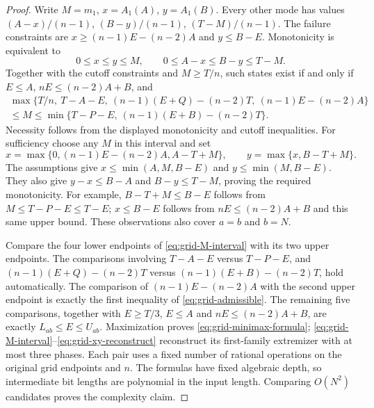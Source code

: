 \begin{proof}
Write $M=m_1$, $x=A_1(A)$, $y=A_1(B)$. Every other mode has values
$(A-x)/(n-1)$, $(B-y)/(n-1)$, $(T-M)/(n-1)$. The failure constraints
are $x\ge(n-1)E-(n-2)A$ and $y\le B-E$. Monotonicity is equivalent to
\[
 0\le x\le y\le M,\qquad 0\le A-x\le B-y\le T-M.
\]
Together with the cutoff constraints and $M\ge T/n$, such states exist
if and only if $E\le A$, $nE\le(n-2)A+B$, and
\begin{equation}\label{eq:grid-M-interval}
\begin{split}
 \max\{T/n,\ T-A-E,\ (n-1)(E+Q)-(n-2)T,\ (n-1)E-(n-2)A\}
 \\
 \le M\le\min\{T-P-E,\ (n-1)(E+B)-(n-2)T\}.
\end{split}
\end{equation}
Necessity follows from the displayed monotonicity and cutoff inequalities.
For sufficiency choose any $M$ in this interval and set
\begin{equation}\label{eq:grid-xy-reconstruct}
 x=\max\{0,(n-1)E-(n-2)A,A-T+M\},\qquad
 y=\max\{x,B-T+M\}.
\end{equation}
The assumptions give $x\le\min(A,M,B-E)$ and
$y\le\min(M,B-E)$. They also give $y-x\le B-A$ and
$B-y\le T-M$, proving the required monotonicity. For example,
$B-T+M\le B-E$ follows from $M\le T-P-E\le T-E$;
$x\le B-E$ follows from $nE\le(n-2)A+B$ and this same upper bound.
These observations also cover $a=b$ and $b=N$.

Compare the four lower endpoints of \eqref{eq:grid-M-interval} with its
two upper endpoints. The comparisons involving $T-A-E$ versus
$T-P-E$, and $(n-1)(E+Q)-(n-2)T$ versus
$(n-1)(E+B)-(n-2)T$, hold automatically.
The comparison of $(n-1)E-(n-2)A$ with the second upper endpoint is
exactly the first inequality of \eqref{eq:grid-admissible}.
The remaining five comparisons, together with $E\ge T/3$, $E\le A$
and $nE\le(n-2)A+B$, are exactly $L_{ab}\le E\le U_{ab}$.
Maximization proves \eqref{eq:grid-minimax-formula};
\eqref{eq:grid-M-interval}--\eqref{eq:grid-xy-reconstruct} reconstruct
its first-family extremizer with at most three phases.
Each pair uses a fixed number of rational operations on the original grid
endpoints and $n$. The formulas have fixed algebraic depth, so intermediate
bit lengths are polynomial in the input length. Comparing $O(N^2)$
candidates proves the complexity claim.
\end{proof}


